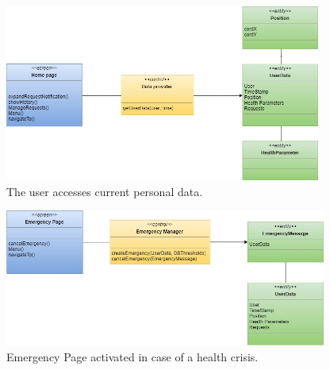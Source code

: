 \begin{figure}[ht]
    \centering
    \includegraphics[width=295pt]{images/BCE/BCE_Diagrams8.jpg}
    \caption{The user accesses current personal data.}
    \label{BCE8}
\end{figure}
\begin{figure}[ht]
    \centering
    \includegraphics[width=300pt]{images/BCE/BCE_Diagrams9.jpg}
    \caption{Emergency Page activated in case of a health crisis.}
    \label{BCE9}
\end{figure}
